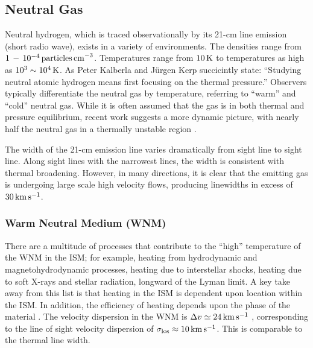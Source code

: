 \documentclass[../dissertation.tex]{subfiles}
\begin{document}
\subsection{Neutral Gas}
Neutral hydrogen, which is traced observationally by its 21-cm line emission (short radio wave), exists in a variety of environments. 
The densities range from $1 \,  - \, 10^{-4} \, {\rm particles \, cm}^{-3}$.
Temperatures range from $10 \, {\rm K}$ to temperatures as high as $10^3 \sim 10^4 \, {\rm K}$. 
As Peter Kalberla and J{\"u}rgen Kerp succicintly state: 
``Studying neutral atomic hydrogen means first focusing on the thermal pressure.'' \citep[p. 47]{2009ARA&A..47...27K}
Observers typically differentiate the neutral gas by temperature, referring to ``warm'' and ``cold'' neutral gas. While it is often assumed that the gas is in both thermal and pressure equilibrium, recent work suggests a more dynamic picture, with nearly half the neutral gas in a thermally unstable region \citep{2003ApJ...586.1067H}. 

The width of the 21-cm emission line varies dramatically from sight line to sight line. Along sight lines with the narrowest lines, the width is consistent with thermal broadening. However, in many directions, it is clear that the emitting gas is undergoing large scale high velocity flows, producing linewidths in excess of $30\,\rm km\,s^{-1}$.

\subsubsection{Warm Neutral Medium (WNM)} %
There are a multitude of processes that contribute to the ``high'' temperature of the WNM in the ISM; 
for example, heating from hydrodynamic and magnetohydrodynamic processes, heating due to interstellar shocks, heating due to soft X-rays and stellar radiation, longward of the Lyman limit.
A key take away from this list is that heating in the ISM is dependent upon location within the ISM. 
In addition, the efficiency of heating depends upon the phase of the material \citep[p. 48]{2009ARA&A..47...27K}. 
The velocity dispersion in the WNM is $\Delta v \simeq 24 \,\rm km\,s^{-1}$ \citep[p. 49]{2009ARA&A..47...27K}, corresponding to the line of sight velocity dispersion of $\sigma_{\rm los} \approx 10 \,\rm km\,s^{-1}$. This is comparable to the thermal line width.
\end{document}
